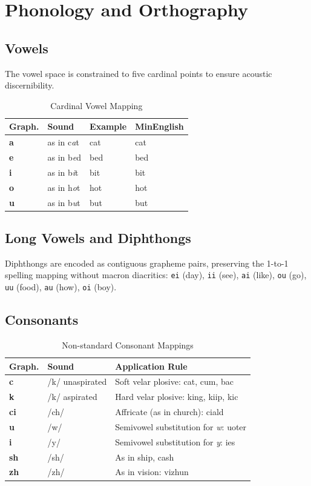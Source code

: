 \documentclass[10pt,twocolumn,letterpaper]{article}
\newcommand{\me}[1]{\texttt{#1}}
\begin{document}
\section{Phonology and Orthography}

\subsection{Vowels}
The vowel space is constrained to five cardinal points to ensure acoustic discernibility.

\begin{table}[h!]
\centering\small
\begin{tabularx}{\linewidth}{llXl}
\toprule
\textbf{Graph.} & \textbf{Sound} & \textbf{Example} & \textbf{MinEnglish} \\
\midrule
\textbf{a} & as in c\textit{a}t & cat & cat \\
\textbf{e} & as in b\textit{e}d & bed & bed \\
\textbf{i} & as in b\textit{i}t & bit & bit \\
\textbf{o} & as in h\textit{o}t & hot & hot \\
\textbf{u} & as in b\textit{u}t & but & but \\
\bottomrule
\end{tabularx}
\caption{Cardinal Vowel Mapping}
\end{table}

\subsection{Long Vowels and Diphthongs}
Diphthongs are encoded as contiguous grapheme pairs, preserving the 1-to-1 spelling mapping without macron diacritics: \me{ei} (day), \me{ii} (see), \me{ai} (like), \me{ou} (go), \me{uu} (food), \me{au} (how), \me{oi} (boy).

\subsection{Consonants}

\begin{table}[h!]
\centering\small
\begin{tabularx}{\linewidth}{llX}
\toprule
\textbf{Graph.} & \textbf{Sound} & \textbf{Application Rule} \\
\midrule
\textbf{c}  & /k/ unaspirated & Soft velar plosive: cat, cum, bac \\
\textbf{k}  & /k/ aspirated   & Hard velar plosive: king, kiip, kic \\
\textbf{ci} & /ch/            & Affricate (as in church): ciald \\
\textbf{u}  & /w/             & Semivowel substitution for \textit{w}: uoter \\
\textbf{i}  & /y/             & Semivowel substitution for \textit{y}: ies \\
\textbf{sh} & /sh/            & As in ship, cash \\
\textbf{zh} & /zh/            & As in vision: vizhun \\
\bottomrule
\end{tabularx}
\caption{Non-standard Consonant Mappings}
\end{table}
\end{document}
